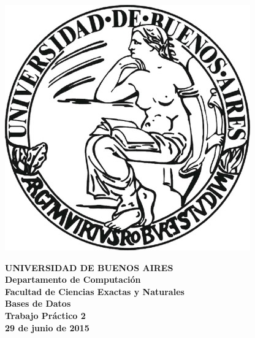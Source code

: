 \documentclass[11pt,a4paper]{article}
\begin{document}

\def\Materia{Bases de Datos}
\def\Titulo{Trabajo Pr\'{a}ctico 2}
\def\Fecha{29 de junio de 2015}


\thispagestyle{empty}

\begin{center}
	\includegraphics[scale = 0.25]{imagenes/logo_uba.jpg}
\end{center}

\begin{center}
	{\textbf{\large UNIVERSIDAD DE BUENOS AIRES}}\\[1.5em]
	{\textbf{\large Departamento de Computaci\'{o}n}}\\[1.5em]
    {\textbf{\large Facultad de Ciencias Exactas y Naturales}}\\
    \vspace{25mm}
    {\LARGE\textbf{\Materia}}\\[1em]    
    \vspace{15mm}
    {\Large \textbf{\Titulo}}\\[1em]
    \vspace{15mm}
    {\textbf{\Large \Fecha}}\\
    \vspace{15mm}
    \vspace{25mm}
    \textbf{\tablaints}
\end{center}
\end{document}
